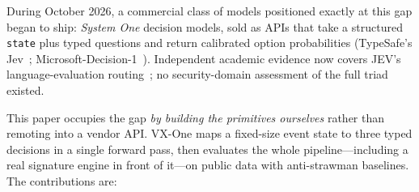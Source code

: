 \documentclass[sigconf,anonymous=false]{acmart}
\begin{document}
During October 2026, a commercial class of models positioned exactly at this gap began to ship: \emph{System One} decision models, sold as APIs that take a structured \texttt{state} plus typed questions and return calibrated option probabilities (TypeSafe's Jev~\cite{jevdocs,typesafejev}; Microsoft-Decision-1~\cite{msdecision1,mslearn-decision1}). Independent academic evidence now covers JEV's language-evaluation routing~\cite{li2026jevjudge}; no security-domain assessment of the full triad existed.

This paper occupies the gap \emph{by building the primitives ourselves} rather than remoting into a vendor API. VX-One maps a fixed-size event state to three typed decisions in a single forward pass, then evaluates the whole pipeline---including a real signature engine in front of it---on public data with anti-strawman baselines. The contributions are:
\end{document}
